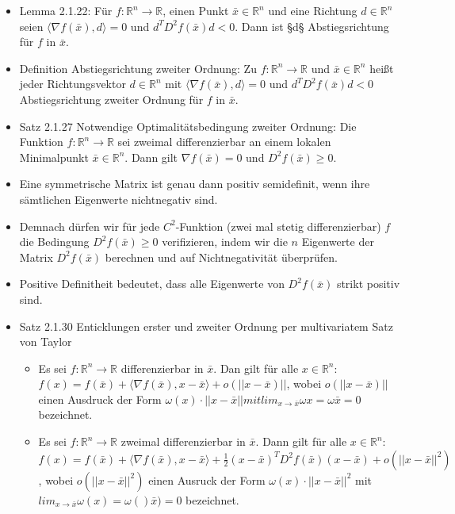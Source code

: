 \documentclass[paper=a4, fontsize=11pt]{scrartcl} %
\numberwithin{equation}{section} %
\numberwithin{figure}{section} %
\numberwithin{table}{section} %
\begin{document}
\begin{itemize}
\item Lemma 2.1.22: Für $f: \mathbb{R}^n \rightarrow \mathbb{R}$, einen Punkt $\bar{x} \in \mathbb{R}^n$ und eine Richtung $d \in \mathbb{R}^n$ seien $\langle \nabla f(\bar{x}),d \rangle = 0$ und $d^T D^2f(\bar{x})d < 0$. Dann ist §d§ Abstiegsrichtung für $f$ in $\bar{x}$.
\item Definition Abstiegsrichtung zweiter Ordnung: Zu $f: \mathbb{R}^n \rightarrow \mathbb{R}$ und $\bar{x} \in \mathbb{R}^n$ heißt jeder Richtungsvektor $d \in \mathbb{R}^n$ mit $\langle \nabla f(\bar{x}), d \rangle = 0$ und $d^T D^2f(\bar{x})d < 0$ Abstiegsrichtung zweiter Ordnung für $f$ in $\bar{x}$.
\item Satz 2.1.27 Notwendige Optimalitätsbedingung zweiter Ordnung: Die Funktion $f: \mathbb{R}^n \rightarrow \mathbb{R}$ sei zweimal differenzierbar an einem lokalen Minimalpunkt $\bar{x} \in \mathbb{R}^n$. Dann gilt $\nabla f(\bar{x}) = 0$ und $D^2f(\bar{x}) \ge 0$.
\item Eine symmetrische Matrix ist genau dann positiv semidefinit, wenn ihre sämtlichen Eigenwerte nichtnegativ sind.
\item Demnach dürfen wir für jede $C^2$-Funktion (zwei mal stetig differenzierbar) $f$ die Bedingung $D^2f(\bar{x}) \ge 0$ verifizieren, indem wir die $n$ Eigenwerte der Matrix $D^2f(\bar{x})$ berechnen und auf Nichtnegativität überprüfen.
\item Positive Definitheit bedeutet, dass alle Eigenwerte von $D^2f(\bar{x})$ strikt positiv sind.
\item Satz 2.1.30 Enticklungen erster und zweiter Ordnung per multivariatem Satz von Taylor
\begin{itemize}
\item Es sei $f: \mathbb{R}^n \rightarrow \mathbb{R}$ differenzierbar in $\bar{x}$. Dan gilt für alle $x \in \mathbb{R}^n$: $f(x) = f(\bar{x}) + \langle \nabla f(\bar{x}), x - \bar{x} \rangle + o(||x-\bar{x})||$, wobei $o(||x-\bar{x})||$ einen Ausdruck der Form $\omega(x) \cdot ||x-\bar{x}|| mit lim_{x \rightarrow \bar{x}} \omega{x} = \omega{\bar{x}} = 0$ bezeichnet.
\item Es sei $f: \mathbb{R}^n \rightarrow \mathbb{R}$ zweimal differenzierbar in $\bar{x}$. Dann gilt für alle $x \in \mathbb{R}^n$: $f(x) = f(\bar{x}) + \langle \nabla f(\bar{x}),x-\bar{x} \rangle + \frac{1}{2}(x-\bar{x})^T D^2f(\bar{x})(x-\bar{x}) + o(||x-\bar{x}||^2)$, wobei $o(||x-\bar{x}||^2)$ einen Ausruck der Form $\omega(x) \cdot ||x-\bar{x}||^2$ mit $lim_{x \rightarrow \bar{x}} \omega(x) = \omega()\bar{x}) = 0$ bezeichnet.

\end{itemize}
\end{itemize}
\end{document}
